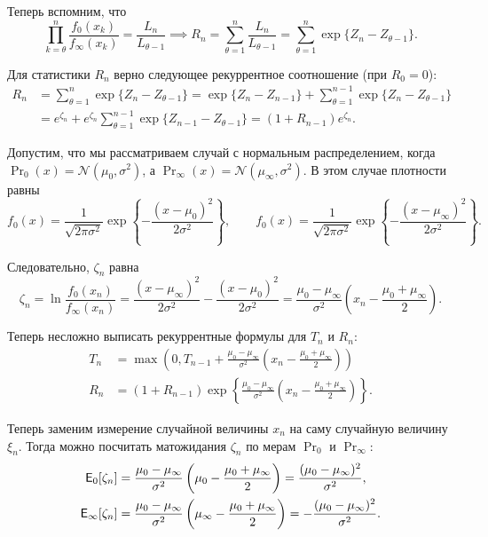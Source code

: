Теперь вспомним, что
\[
	\prod_{k = \theta}^{n} \frac{f_{0}(x_{k})}{f_{\infty}(x_{k})} 
	= \frac{L_{n}}{L_{\theta - 1}} 
	\implies 
	R_{n} 
	= \sum_{\theta = 1}^{n} \frac{L_{n}}{L_{\theta - 1}} 
	= \sum_{\theta = 1}^{n} \exp\{Z_{n} - Z_{\theta - 1}\}.
\]

Для статистики \(R_{n}\) верно следующее рекуррентное соотношение (при \(R_{0} = 0\)):
\begin{align*}
	R_{n} 
	&= \sum_{\theta = 1}^{n} \exp\{Z_{n} - Z_{\theta - 1}\} 
	= \exp\{Z_{n} - Z_{n - 1}\} + \sum_{\theta = 1}^{n - 1} \exp\{Z_{n} - Z_{\theta - 1}\} \\
	&= e^{\zeta_{n}} + e^{\zeta_{n}}\sum_{\theta = 1}^{n - 1} \exp\{Z_{n - 1} - Z_{\theta - 1}\}
	= (1 + R_{n - 1})e^{\zeta_{n}}.
\end{align*}

Допустим, что мы рассматриваем случай с нормальным распределением, когда \(\Pr_{0}(x) = \mathcal{N}(\mu_{0}, \sigma^{2})\), а \(\Pr_{\infty}(x) = \mathcal{N}(\mu_{\infty}, \sigma^{2})\). 
В этом случае плотности равны
\[
	f_{0}(x) 
	= \frac{1}{\sqrt{2\pi\sigma^{2}}} \exp\left\{-\frac{(x - \mu_{0})^{2}}{2\sigma^{2}}\right\},
	\qquad
	f_{0}(x) 
	= \frac{1}{\sqrt{2\pi\sigma^{2}}} \exp\left\{-\frac{(x - \mu_{\infty})^{2}}{2\sigma^{2}}\right\}.
\]

Следовательно, \(\zeta_{n}\) равна
\[
	\zeta_{n} 
	= \ln\frac{f_{0}(x_{n})}{f_{\infty}(x_{n})}
	= \frac{(x - \mu_{\infty})^{2}}{2\sigma^{2}} - \frac{(x - \mu_{0})^{2}}{2\sigma^{2}}
	= \frac{\mu_{0} - \mu_{\infty}}{\sigma^{2}}\left(x_{n} - \frac{\mu_{0} + \mu_{\infty}}{2}\right).
\]

Теперь несложно выписать рекуррентные формулы для \(T_{n}\) и \(R_{n}\):
\begin{align*}
	T_{n} 
	&= \max\left(
		0,
		T_{n - 1} + \frac{\mu_{0} - \mu_{\infty}}{\sigma^{2}}\left(x_{n} - \frac{\mu_{0} + \mu_{\infty}}{2}\right)
	\right) \\
	R_{n} 
	&= (1 + R_{n - 1})\exp\left\{\frac{\mu_{0} - \mu_{\infty}}{\sigma^{2}}\left(x_{n} - \frac{\mu_{0} + \mu_{\infty}}{2}\right)\right\}.
\end{align*}

Теперь заменим измерение случайной величины \(x_{n}\) на саму случайную величину \(\xi_{n}\). 
Тогда можно посчитать матожидания \(\zeta_{n}\) по мерам \(\Pr_{0}\) и \(\Pr_{\infty}\):
\begin{align*}
	\E_{0}[\zeta_{n}] 
	&= \frac{\mu_{0} - \mu_{\infty}}{\sigma^{2}}\left(\mu_{0} - \frac{\mu_{0} + \mu_{\infty}}{2}\right)
	= \frac{(\mu_{0} - \mu_{\infty})^{2}}{\sigma^{2}}, \\
	\E_{\infty}[\zeta_{n}] 
	&= \frac{\mu_{0} - \mu_{\infty}}{\sigma^{2}}\left(\mu_{\infty} - \frac{\mu_{0} + \mu_{\infty}}{2}\right)
	= -\frac{(\mu_{0} - \mu_{\infty})^{2}}{\sigma^{2}}.
\end{align*}

